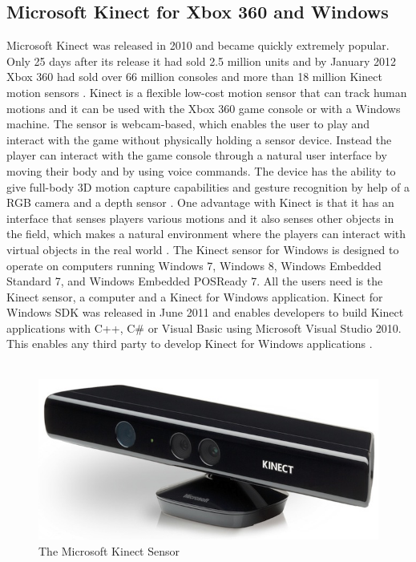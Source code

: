 \subsection{Microsoft Kinect for Xbox 360 and Windows}
Microsoft Kinect was released in 2010 and became quickly extremely popular. Only 25 days after its release it had sold 2.5 million units and by January 2012 Xbox 360 had sold over 66 million consoles and more than 18 million Kinect motion sensors \cite{consoles} \cite{kinectsold}. Kinect is a flexible low-cost motion sensor that can track human motions and it can be used with the Xbox 360 game console or with a Windows machine.  The sensor is webcam-based, which enables the user to play and interact with the game without physically holding a sensor device. Instead the player can interact with the game console through a natural user interface by moving their body and by using voice commands. The device has the ability to give full-body 3D motion capture capabilities and gesture recognition by help of a RGB camera and a depth sensor \cite{kinect}. One advantage with Kinect is that it has an interface that senses players various motions and it also senses other objects in the field, which makes a natural environment where the players can interact with virtual objects in the real world \cite{comparison}. The Kinect sensor for Windows is designed to operate on computers running Windows 7, Windows 8, Windows Embedded Standard 7, and Windows Embedded POSReady 7. All the users need is the Kinect sensor, a computer and a Kinect for Windows application. Kinect for Windows SDK was released in June 2011 and enables developers to build Kinect applications with C++, C\# or Visual Basic using Microsoft Visual Studio 2010. This enables any third party to develop Kinect for Windows applications \cite{kinectwindows}.\\ \\
\begin{figure}[h!]
\begin{center}
\includegraphics[scale=0.3]{kinect}
\caption[Kinect Sensor]{The Microsoft Kinect Sensor}
\label{fig:KinectSensor}
\end{center}
\end{figure}

